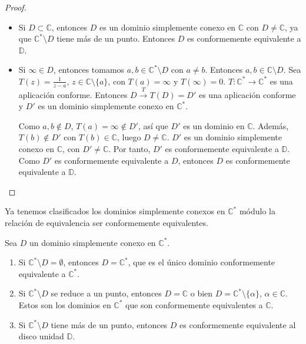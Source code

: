 \begin{proof}
    \hfill
    \begin{itemize}
        \item Si $D \subset \mathbb{C}$, entonces $D$ es un dominio simplemente conexo en $\mathbb{C}$ con $D \neq \mathbb{C}$, ya que $\mathbb{C}^\ast \setminus D$ tiene más de un punto.
              Entonces $D$ es conformemente equivalente a $\mathbb{D}$.
        \item Si $\infty \in D$, entonces tomamos $a, b \in \mathbb{C}^\ast \setminus D$ con $a \neq b$.
              Entonces $a, b \in \mathbb{C} \setminus D$.
              Sea $T(z) = \frac{1}{z-a}$, $z \in \mathbb{C} \setminus \{a\}$, con $T(a) = \infty$ y $T(\infty) = 0$.
              $T: \mathbb{C}^\ast \to \mathbb{C}^\ast$ es una aplicación conforme.
              Entonces $D \xrightarrow{T} T(D) = D'$ es una aplicación conforme y $D'$ es un dominio simplemente conexo en $\mathbb{C}^\ast$.

              Como $a, b \notin D$, $T(a) = \infty \notin D'$, así que $D'$ es un dominio en $\mathbb{C}$.
              Además, $T(b) \notin D'$ con $T(b) \in \mathbb{C}$, luego $D \neq \mathbb{C}$.
              $D'$ es un dominio simplemente conexo en $\mathbb{C}$, con $D' \neq \mathbb{C}$.
              Por tanto, $D'$ es conformemente equivalente a $\mathbb{D}$.
              Como $D'$ es conformemente equivalente a $D$, entonces $D$ es conformemente equivalente a $\mathbb{D}$.
    \end{itemize}
\end{proof}

Ya tenemos clasificados los dominios simplemente conexos en $\mathbb{C}^\ast$ módulo la relación de equivalencia ser conformemente equivalentes.

Sea $D$ un dominio simplemente conexo en $\mathbb{C}^\ast$.
\begin{enumerate}
    \item Si $\mathbb{C}^\ast \setminus D = \emptyset$, entonces $D = \mathbb{C}^\ast$, que es el único dominio conformemente equivalente a $\mathbb{C}^\ast$.
    \item Si $\mathbb{C}^\ast \setminus D$ se reduce a un punto, entonces $D = \mathbb{C}$ o bien $D = \mathbb{C}^\ast \setminus \{\alpha\}$, $\alpha \in \mathbb{C}$.
          Estos son los dominios en $\mathbb{C}^\ast$ que son conformemente equivalentes a $\mathbb{C}$.
    \item Si $\mathbb{C}^\ast \setminus D$ tiene más de un punto, entonces $D$ es conformemente equivalente al disco unidad $\mathbb{D}$.
\end{enumerate}

